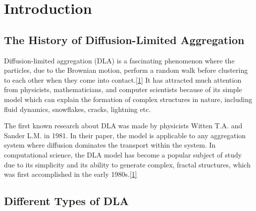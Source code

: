 \documentclass[10pt]{article}
\begin{document}
\newpage

\tableofcontents

\newpage

\section{Introduction}

\subsection{The History of Diffusion-Limited Aggregation}

Diffusion-limited aggregation (DLA) is a fascinating phenomenon where the particles, due to the Brownian motion, perform a random walk before clustering to each other when they come into contact.\hyperref[ref1]{[1]} It has attracted much attention from physicists, mathematicians, and computer scientists because of its simple model which can explain the formation of complex structures in nature, including fluid dynamics, snowflakes, cracks, lightning etc.

The first known research about DLA was made by physicists Witten T.A. and Sander L.M. in 1981. In their paper, the model is applicable to any aggregation system where diffusion dominates the transport within the system. In computational science, the DLA model has become a popular subject of study due to its simplicity and its ability to generate complex, fractal structures, which was first accomplished in the early 1980s.\hyperref[ref1]{[1]}

\subsection{Different Types of DLA}
\end{document}
